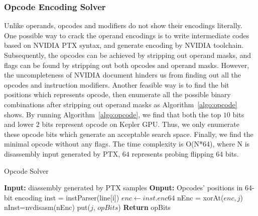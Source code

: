 
\subsubsection{Opcode Encoding Solver}
Unlike operands, opcodes and modifiers do not show their encodings literally. One possible way to crack the operand 
encodings is to write intermediate codes
based on NVIDIA PTX syntax, and generate encoding by NVIDIA toolchain.
Subsequently, the opcodes can be achieved by stripping out operand masks, and
flags can be found by stripping out both opcodes and operand masks.
However, the uncompleteness of NVIDIA document hinders us from finding out all the opcodes and instruction modifiers. 
Another feasible way is to find the bit positions which represents opcode, then
enumerate all the possible binary combinations after stripping out operand masks as Algorithm~\ref{algo:opcode} shows.
By running Algorithm~\ref{algo:opcode}, we find that both the top $10$ bits and lower $2$ bits represent opcode on Kepler GPU.
Thus, we only enumerate these opcode bits which generate an acceptable search space. Finally, we find 
the minimal opcode without any flags. The time complexity is O(N*64), where N
is disassembly input generated by PTX, $64$ represents probing flipping 64
bits.

\begin{algorithm}[htbp]
      \caption{Opcode Solver}\label{algo:opcode}
  \begin{algorithmic}[1]
      \State \textbf {Input:} diassembly generated by PTX samples
      \State \textbf {Onput:} Opcodes' positions in 64-bit encoding
      \State inst = instParser(line[i])
      \State $enc \gets inst.enc64$
      \State nEnc = xorAt($enc, j$)
      \State nInst=nvdisasm(nEnc)
      \State put($j$, $opBits$)
      \EndIf
      \EndFor
      \EndFor
      \State \textbf{Return} opBits %
  \end{algorithmic}
\end{algorithm}

